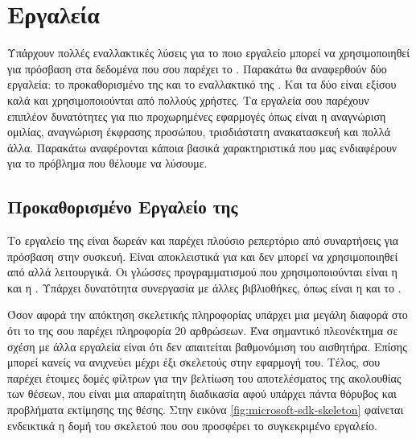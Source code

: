 \section{Εργαλεία}

Υπάρχουν πολλές εναλλακτικές λύσεις για το ποιο εργαλείο μπορεί να χρησιμοποιηθεί για πρόσβαση στα δεδομένα που σου παρέχει το . Παρακάτω θα αναφερθούν δύο εργαλεία: το προκαθορισμένο  της  και το εναλλακτικό της . Και τα δύο είναι εξίσου καλά και χρησιμοποιούνται από πολλούς χρήστες. Τα εργαλεία σου παρέχουν επιπλέον δυνατότητες για πιο προχωρημένες εφαρμογές όπως είναι η αναγνώριση ομιλίας, αναγνώριση έκφρασης προσώπου, τρισδιάστατη ανακατασκευή και πολλά άλλα. Παρακάτω αναφέρονται κάποια βασικά χαρακτηριστικά που μας ενδιαφέρουν για το πρόβλημα που θέλουμε να λύσουμε.

\subsection{\texorpdfstring{Προκαθορισμένο Εργαλείο της }{}}

Το εργαλείο της  είναι δωρεάν και παρέχει πλούσιο ρεπερτόριο από συναρτήσεις για πρόσβαση στην συσκευή. Είναι αποκλειστικά για  και δεν μπορεί να χρησιμοποιηθεί από αλλά λειτουργικά. Οι γλώσσες προγραμματισμού που χρησιμοποιούνται είναι η  και η . Υπάρχει δυνατότητα συνεργασία με άλλες βιβλιοθήκες, όπως είναι η  και το .

Όσον αφορά την απόκτηση σκελετικής πληροφορίας υπάρχει μια μεγάλη διαφορά στο ότι το  της  σου παρέχει πληροφορία 20 αρθρώσεων. Ένα σημαντικό πλεονέκτημα σε σχέση με άλλα εργαλεία είναι ότι δεν απαιτείται βαθμονόμιση του αισθητήρα. Επίσης μπορεί κανείς να ανιχνεύει μέχρι έξι σκελετούς στην εφαρμογή του. Τέλος, σου παρέχει έτοιμες δομές φίλτρων για την βελτίωση του αποτελέσματος της ακολουθίας των θέσεων, που είναι μια απαραίτητη διαδικασία αφού υπάρχει πάντα θόρυβος και προβλήματα εκτίμησης της θέσης. Στην εικόνα \ref{fig:microsoft-sdk-skeleton} φαίνεται ενδεικτικά η δομή του σκελετού που σου προσφέρει το συγκεκριμένο εργαλείο.

